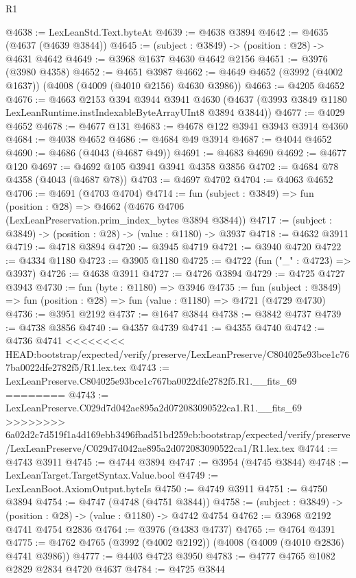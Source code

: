 \begin{lexlean}{R1}
\begin{coremodule}
{{{{{{{{{{{{{{{{{{{{{{{{{{{{{{{{{{{{{{{{{{{{{{{{{{{{{{{{{{{{{{{{{{{{{{{{{{{{{{{{{{{{{{{{{{{{{{{{{{{{{{{{{{{{{{{{{{{{{{{{{{{{{{{{{{{{{{{{{{{{{{{{{{{{{{{{{{{{{{{{{{{{{{{{{{{{{{{{{{{{{{{{{{@4638 := LexLeanStd.Text.byteAt
@4639 := @4638 @3894
@4642 := @4635 (@4637 (@4639 @3844))
@4645 := (subject : @3849) -> (position : @28) -> @4631 @4642
@4649 := @3968 @1637 @4630 @4642 @2156
@4651 := @3976 (@3980 @4358)
@4652 := @4651 @3987
@4662 := @4649 @4652 (@3992 (@4002 @1637)) (@4008 (@4009 (@4010 @2156) @4630 @3986))
@4663 := @4205 @4652
@4676 := @4663
    @2153
    @394
    @3944
    @3941
    @4630
    (@4637 (@3993 @3849 @1180 LexLeanRuntime.instIndexableByteArrayUInt8 @3894 @3844))
@4677 := @4029 @4652
@4678 := @4677 @131
@4683 := @4678 @122 @3941 @3943 @3914 @4360
@4684 := @4038 @4652
@4686 := @4684 @49 @3914
@4687 := @4044 @4652
@4690 := @4686 (@4043 (@4687 @49))
@4691 := @4683 @4690
@4692 := @4677 @120
@4697 := @4692 @105 @3941 @3941 @4358 @3856
@4702 := @4684 @78 @4358 (@4043 (@4687 @78))
@4703 := @4697 @4702
@4704 := @4063 @4652
@4706 := @4691 (@4703 @4704)
@4714 := fun (subject : @3849) =>
  fun (position : @28) => @4662 (@4676 @4706 (LexLeanPreservation.prim_index_bytes @3894 @3844))
@4717 := (subject : @3849) -> (position : @28) -> (value : @1180) -> @3937
@4718 := @4632 @3911
@4719 := @4718 @3894
@4720 := @3945 @4719
@4721 := @3940 @4720
@4722 := @4334 @1180
@4723 := @3905 @1180
@4725 := @4722 (fun ("_" : @4723) => @3937)
@4726 := @4638 @3911
@4727 := @4726 @3894
@4729 := @4725 @4727 @3943
@4730 := fun (byte : @1180) => @3946
@4735 := fun (subject : @3849) => fun (position : @28) => fun (value : @1180) => @4721 (@4729 @4730)
@4736 := @3951 @2192
@4737 := @1647 @3844
@4738 := @3842 @4737
@4739 := @4738 @3856
@4740 := @4357 @4739
@4741 := @4355 @4740
@4742 := @4736 @4741
<<<<<<<< HEAD:bootstrap/expected/verify/preserve/LexLeanPreserve/C804025e93bce1c767ba0022dfe2782f5/R1.lex.tex
@4743 := LexLeanPreserve.C804025e93bce1c767ba0022dfe2782f5.R1.__fits_69
========
@4743 := LexLeanPreserve.C029d7d042ae895a2d072083090522ca1.R1.__fits_69
>>>>>>>> 6a02d2c7d519f1a4d169ebb3496fbad51bd259cb:bootstrap/expected/verify/preserve/LexLeanPreserve/C029d7d042ae895a2d072083090522ca1/R1.lex.tex
@4744 := @4743 @3911
@4745 := @4744 @3894
@4747 := @3954 (@4745 @3844)
@4748 := LexLeanTarget.TargetSyntax.Value.bool
@4749 := LexLeanBoot.AxiomOutput.byteIs
@4750 := @4749 @3911
@4751 := @4750 @3894
@4754 := @4747 (@4748 (@4751 @3844))
@4758 := (subject : @3849) -> (position : @28) -> (value : @1180) -> @4742 @4754
@4762 := @3968 @2192 @4741 @4754 @2836
@4764 := @3976 (@4383 @4737)
@4765 := @4764 @4391
@4775 := @4762 @4765 (@3992 (@4002 @2192)) (@4008 (@4009 (@4010 @2836) @4741 @3986))
@4777 := @4403 @4723 @3950
@4783 := @4777 @4765 @1082 @2829 @2834 @4720 @4637
@4784 := @4725 @3844
}}}}}}}}}}}}}}}}}}}}}}}}}}}}}}}}}}}}}}}}}}}}}}}}}}}}}}}}}}}}}}}}}}}}}}}}}}}}}}}}}}}}}}}}}}}}}}}}}}}}}}}}}}}}}}}}}}}}}}}}}}}}}}}}}}}}}}}}}}}}}}}}}}}}}}}}}}}}}}}}}}}}}}}}}}}}}}}}}}}}}}}}}}
\end{coremodule}
\end{lexlean}
